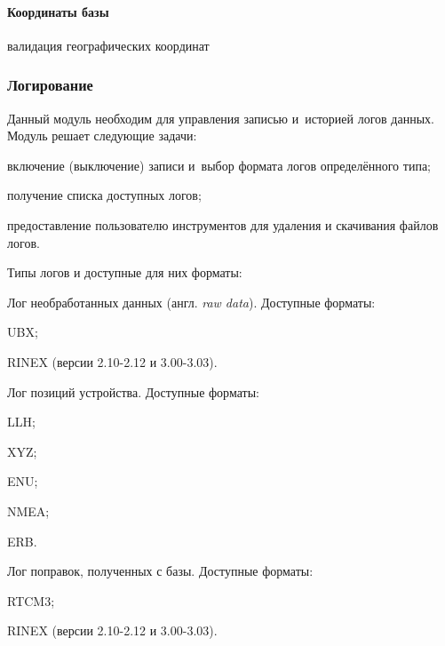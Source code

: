 \paragraph{Координаты базы}

валидация географических координат


\subsubsection{Логирование}

Данный модуль необходим для управления записью и~историей логов данных. Модуль решает следующие задачи:
\begin{dashitemize}
  \item включение (выключение) записи и~выбор формата логов определённого типа;
  \item получение списка доступных логов;
  \item предоставление пользователю инструментов для удаления и скачивания файлов логов.
\end{dashitemize}

Типы логов и доступные для них форматы:
\begin{dashitemize}
  \item Лог необработанных данных (англ. \emph{raw data}). Доступные форматы:
  \begin{dashitemize}
    \item UBX;
    \item RINEX (версии 2.10-2.12 и 3.00-3.03).
  \end{dashitemize}
  
  \item Лог позиций устройства. Доступные форматы:
  \begin{dashitemize}
    \item LLH;
    \item XYZ;
    \item ENU;
    \item NMEA;
    \item ERB.
  \end{dashitemize}
  
  \item Лог поправок, полученных с базы. Доступные форматы:
  \begin{dashitemize}
    \item RTCM3;
    \item RINEX (версии 2.10-2.12 и 3.00-3.03).
  \end{dashitemize}
\end{dashitemize}


